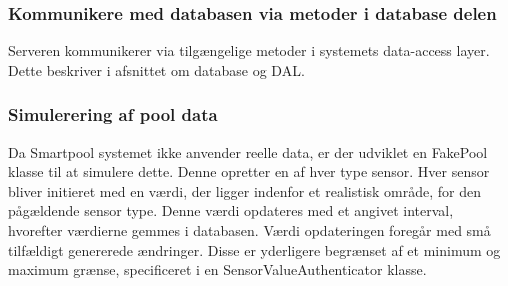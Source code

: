 \subsubsection{Kommunikere med databasen via metoder i database delen}
Serveren kommunikerer via tilgængelige metoder i systemets data-access layer. Dette beskriver i afsnittet om database og DAL.

\subsubsection{Simulerering af pool data}
Da Smartpool systemet ikke anvender reelle data, er der udviklet en FakePool klasse til at simulere dette. Denne opretter en af hver type sensor. Hver sensor bliver initieret med en værdi, der ligger indenfor et realistisk område, for den pågældende sensor type. 
Denne værdi opdateres med et angivet interval, hvorefter værdierne gemmes i databasen. Værdi opdateringen foregår med små tilfældigt genererede ændringer. Disse er yderligere begrænset af et minimum og maximum grænse, specificeret i en SensorValueAuthenticator klasse.  
